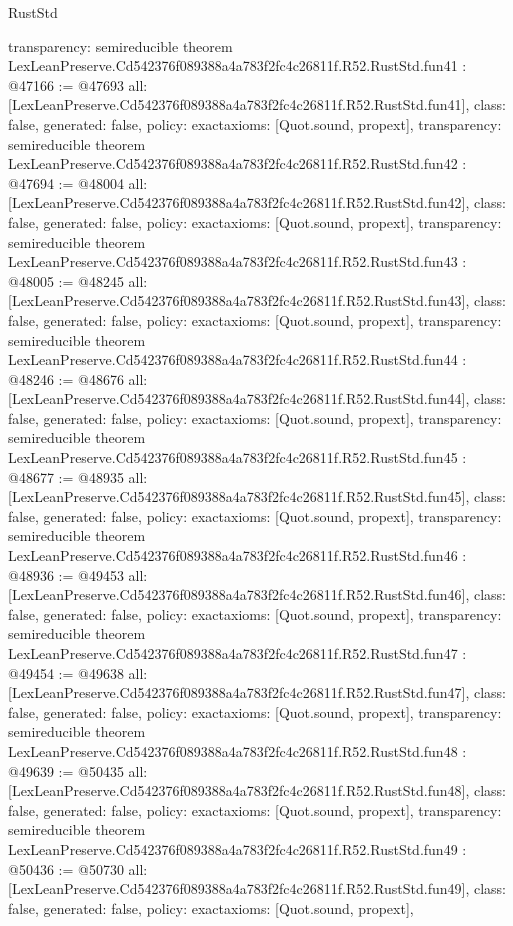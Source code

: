 \begin{lexlean}{RustStd}
\begin{coremodule}
{  transparency: semireducible
}
theorem LexLeanPreserve.Cd542376f089388a4a783f2fc4c26811f.R52.RustStd.fun41 : @47166 := @47693 {
  all: [LexLeanPreserve.Cd542376f089388a4a783f2fc4c26811f.R52.RustStd.fun41],
  class: false,
  generated: false,
  policy: exact{axioms: [Quot.sound, propext]},
  transparency: semireducible
}
theorem LexLeanPreserve.Cd542376f089388a4a783f2fc4c26811f.R52.RustStd.fun42 : @47694 := @48004 {
  all: [LexLeanPreserve.Cd542376f089388a4a783f2fc4c26811f.R52.RustStd.fun42],
  class: false,
  generated: false,
  policy: exact{axioms: [Quot.sound, propext]},
  transparency: semireducible
}
theorem LexLeanPreserve.Cd542376f089388a4a783f2fc4c26811f.R52.RustStd.fun43 : @48005 := @48245 {
  all: [LexLeanPreserve.Cd542376f089388a4a783f2fc4c26811f.R52.RustStd.fun43],
  class: false,
  generated: false,
  policy: exact{axioms: [Quot.sound, propext]},
  transparency: semireducible
}
theorem LexLeanPreserve.Cd542376f089388a4a783f2fc4c26811f.R52.RustStd.fun44 : @48246 := @48676 {
  all: [LexLeanPreserve.Cd542376f089388a4a783f2fc4c26811f.R52.RustStd.fun44],
  class: false,
  generated: false,
  policy: exact{axioms: [Quot.sound, propext]},
  transparency: semireducible
}
theorem LexLeanPreserve.Cd542376f089388a4a783f2fc4c26811f.R52.RustStd.fun45 : @48677 := @48935 {
  all: [LexLeanPreserve.Cd542376f089388a4a783f2fc4c26811f.R52.RustStd.fun45],
  class: false,
  generated: false,
  policy: exact{axioms: [Quot.sound, propext]},
  transparency: semireducible
}
theorem LexLeanPreserve.Cd542376f089388a4a783f2fc4c26811f.R52.RustStd.fun46 : @48936 := @49453 {
  all: [LexLeanPreserve.Cd542376f089388a4a783f2fc4c26811f.R52.RustStd.fun46],
  class: false,
  generated: false,
  policy: exact{axioms: [Quot.sound, propext]},
  transparency: semireducible
}
theorem LexLeanPreserve.Cd542376f089388a4a783f2fc4c26811f.R52.RustStd.fun47 : @49454 := @49638 {
  all: [LexLeanPreserve.Cd542376f089388a4a783f2fc4c26811f.R52.RustStd.fun47],
  class: false,
  generated: false,
  policy: exact{axioms: [Quot.sound, propext]},
  transparency: semireducible
}
theorem LexLeanPreserve.Cd542376f089388a4a783f2fc4c26811f.R52.RustStd.fun48 : @49639 := @50435 {
  all: [LexLeanPreserve.Cd542376f089388a4a783f2fc4c26811f.R52.RustStd.fun48],
  class: false,
  generated: false,
  policy: exact{axioms: [Quot.sound, propext]},
  transparency: semireducible
}
theorem LexLeanPreserve.Cd542376f089388a4a783f2fc4c26811f.R52.RustStd.fun49 : @50436 := @50730 {
  all: [LexLeanPreserve.Cd542376f089388a4a783f2fc4c26811f.R52.RustStd.fun49],
  class: false,
  generated: false,
  policy: exact{axioms: [Quot.sound, propext]},
}
\end{coremodule}
\end{lexlean}
